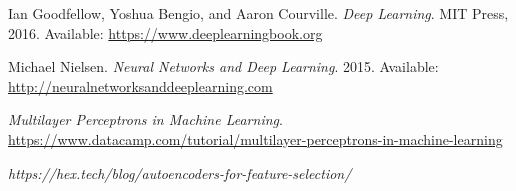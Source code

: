 \begin{thebibliography}{9}

Ian Goodfellow, Yoshua Bengio, and Aaron Courville. 
\textit{Deep Learning}. 
MIT Press, 2016. Available: \url{https://www.deeplearningbook.org}

Michael Nielsen. 
\textit{Neural Networks and Deep Learning}. 
2015. Available: \url{http://neuralnetworksanddeeplearning.com}

\textit{Multilayer Perceptrons in Machine Learning}.  \url{https://www.datacamp.com/tutorial/multilayer-perceptrons-in-machine-learning}

\textit{https://hex.tech/blog/autoencoders-for-feature-selection/}
\end{thebibliography}
